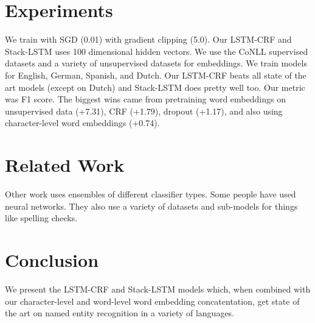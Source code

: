 \documentclass[a4paper]{article}
\begin{document}
\section{Experiments}
We train with SGD (0.01) with gradient clipping (5.0). Our LSTM-CRF and
Stack-LSTM uses 100 dimensional hidden vectors. We use the CoNLL supervised
datasets and a variety of unsupervised datasets for embeddings. We train models
for English, German, Spanish, and Dutch. Our LSTM-CRF beats all state of the art
models (except on Dutch) and Stack-LSTM does pretty well too. Our metric was
F1 score. The biggest wins came from pretraining word embeddings on unsupervised
data (+7.31), CRF (+1.79), dropout (+1.17), and also using character-level
word embeddings (+0.74).

\section{Related Work}
Other work uses ensembles of different classifier types. Some people have
used neural networks. They also use a variety of datasets and sub-models
for things like spelling checks.

\section{Conclusion}
We present the LSTM-CRF and Stack-LSTM models which, when combined with
our character-level and word-level word embedding concatentation, get
state of the art on named entity recognition in a variety of languages.
\end{document}
